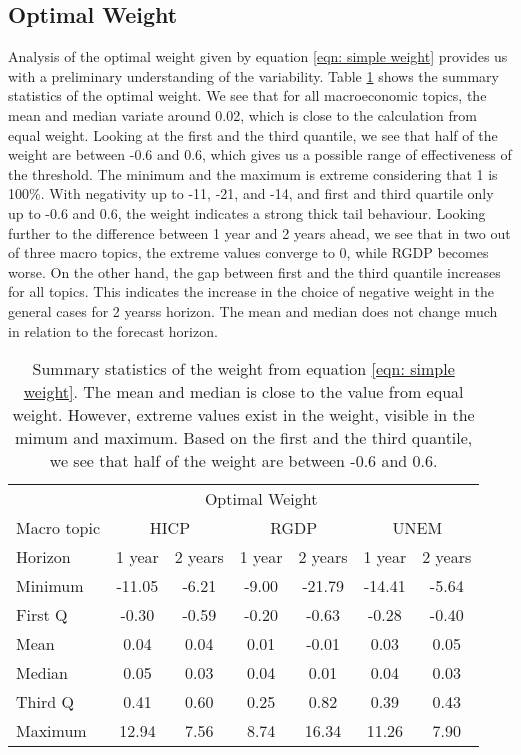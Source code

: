 \documentclass[11pt]{article}
\begin{document}
\subsection{Optimal Weight}\label{optimal-weight}
Analysis of the optimal weight given by equation
\ref{eqn: simple weight} provides us with a preliminary understanding of the
variability. Table \ref{tab: simple weight summary statistics} shows the
summary statistics of the optimal weight. We see that for all macroeconomic
topics, the mean and median variate around 0.02, which is close to the
calculation from equal weight. Looking at the first and the third
quantile, we see that half of the weight are between -0.6 and 0.6,
which gives us a possible range of effectiveness of the threshold. The
minimum and the maximum is extreme considering that 1 is 100\%. With
negativity up to -11, -21, and -14, and first and third quartile only up
to -0.6 and 0.6, the weight indicates a strong thick tail behaviour.
Looking further to the difference between 1 year and 2 years ahead, we
see that in two out of three macro topics, the extreme
values converge to 0, while RGDP becomes worse. On the other hand, the
gap between first and the third quantile increases for all topics. This
indicates the increase in the choice of negative weight in the general
cases for 2 yearss horizon. The mean and median does not change much in
relation to the forecast horizon.

\begin{table}[!h]
	\centering
	\caption{Summary statistics of the weight from equation \ref{eqn: simple weight}. The mean and median is close to the value from equal weight. However, extreme values exist in the weight, visible in the mimum and maximum. Based on the first and the third quantile, we see that half of the weight are between -0.6 and 0.6.}
	\label{tab: simple weight summary statistics}
	\begin{tabular}{lcccccc}%
		\hline
		&\multicolumn{5}{c}{Optimal Weight}\\
		\cmidrule(lr){2-7}
		Macro topic & \multicolumn{2}{c}{HICP} & \multicolumn{2}{c}{RGDP} & \multicolumn{2}{c}{UNEM} \\
		\cmidrule(lr){2-3} \cmidrule(lr){4-5}\cmidrule(lr){6-7}
		Horizon     & 1 year & 2 years & 1 year & 2 years & 1 year & 2 years \\ 
		\hline
		Minimum      & -11.05      & -6.21      & -9.00      & -21.79      & -14.41      & -5.64      \\
		First Q      & -0.30       & -0.59      & -0.20      & -0.63       & -0.28       & -0.40      \\
		Mean         & 0.04        & 0.04       & 0.01       & -0.01       & 0.03        & 0.05       \\
		Median       & 0.05        & 0.03       & 0.04       & 0.01        & 0.04        & 0.03       \\
		Third Q      & 0.41        & 0.60       & 0.25       & 0.82        & 0.39        & 0.43       \\
		Maximum      & 12.94       & 7.56       & 8.74       & 16.34       & 11.26       & 7.90       \\ 
		\hline
	\end{tabular}
\end{table}
\end{document}

